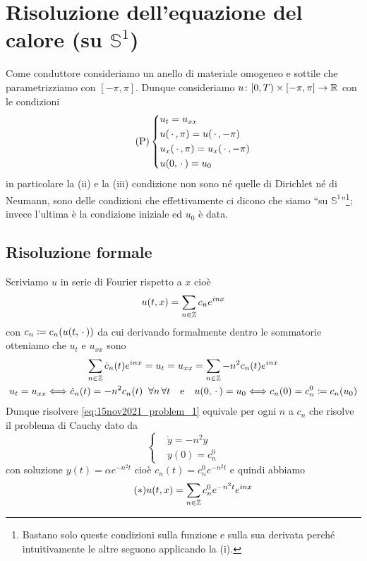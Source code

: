 

\section{Risoluzione dell'equazione del calore (su $\mathbb S^1$)}

Come conduttore consideriamo un anello di materiale omogeneo e sottile che parametrizziamo con $[-\pi, \pi]$. Dunque consideriamo $u \colon [0, T) \times [-\pi, \pi] \to \mathbb R$ con le condizioni
\begin{equation}
\tag{P} \label{	qeq:15nov2021_problem_1}
\left\{
\begin{aligned}
	& u_t = u_{xx} \\
	& u(\,\cdot\,, \pi) = u(\,\cdot\,, -\pi) \\
	& u_x(\,\cdot\,, \pi) = u_x(\,\cdot\,, -\pi) \\
	& u(0, \,\cdot\,) = u_0
\end{aligned}
\right.
\end{equation}
in particolare la (ii) e la (iii) condizione non sono né quelle di Dirichlet né di Neumann, sono delle condizioni che effettivamente ci dicono che siamo ``su $\mathbb S^1$''\footnote{Bastano solo queste condizioni sulla funzione e sulla sua derivata perché intuitivamente le altre seguono applicando la (i).}; invece l'ultima è la condizione iniziale ed $u_0$ è data.

\subsection{Risoluzione formale}

Scriviamo $u$ in serie di Fourier rispetto a $x$ cioè
$$
u(t, x) = \sum_{n \in \mathbb Z} c_n e^{inx}
$$
con $c_n \coloneqq c_n(u(t, \,\cdot\,))$ da cui derivando formalmente dentro le sommatorie otteniamo che $u_t$ e $u_{xx}$ sono
$$
\begin{gathered}
	\sum_{n \in \mathbb Z} \dot c_n(t) e^{inx} = u_t = u_{xx} = \sum_{n \in \mathbb Z} -n^2 c_n(t) e^{inx} \\
	u_t = u_{xx} \Longleftrightarrow  \dot c_n(t) = -n^2 c_n(t) \;\; \forall n \, \forall t
	\quad
	\text{e} 
	\quad
	u(0, \,\cdot\,) = u_0 \Longleftrightarrow c_n(0) = c_n^0 \coloneqq c_n(u_0)
\end{gathered}
$$
Dunque risolvere \ref{eq:15nov2021_problem_1} equivale per ogni $n$ a $c_n$ che risolve il problema di Cauchy dato da
\begin{equation}
	\tag{P$'$} \label{eq:15nov2021_problem_2}
	\left\{
	\begin{aligned}
		& \dot y = -n^2 y \\
		& y(0) = c_n^0
	\end{aligned}
	\right.
\end{equation}
con soluzione $y(t) = \alpha e^{-n^2 t}$ cioè $c_n(t) = c_n^0 e^{-n^2 t}$ e quindi abbiamo
\begin{equation}
	\tag{$*$} \label{eq:15nov2021_solution}
	u(t, x) = \sum_{n \in \mathbb Z} c_n^0 e^{-n^2 t} e^{inx}
\end{equation}

